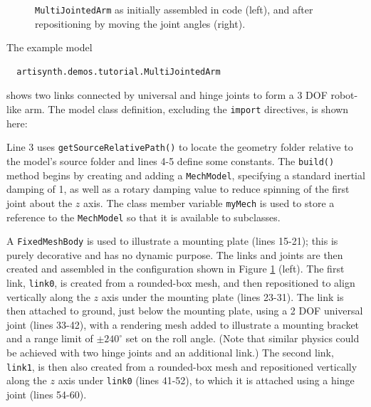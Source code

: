 \begin{figure}[ht]
\begin{center}
\begin{tabular}{cc}
\end{tabular}
\end{center}
\caption{{\tt MultiJointedArm} as initially assembled in code (left),
and after repositioning by moving the joint angles (right).}
\label{MultiJointedArm:fig}
\end{figure}

The example model
%
\begin{verbatim}
  artisynth.demos.tutorial.MultiJointedArm
\end{verbatim}
%
shows two links connected by universal and hinge joints to form a 3 DOF
robot-like arm. The model class definition, excluding the {\tt import} directives,
is shown here:
%
\lstset{numbers=left}
\iflatexml

\else

\fi
\lstset{numbers=none}
%
Line 3 uses {\tt getSourceRelativePath()} to locate the geometry folder
relative to the model's source folder and lines 4-5 define some constants.  The
{\tt build()} method begins by creating and adding a {\tt MechModel},
specifying a standard inertial damping of 1, as well as a rotary damping value
to reduce spinning of the first joint about the $z$ axis. The class member
variable {\tt myMech} is used to store a reference to the {\tt MechModel} so
that it is available to subclasses.

A {\tt FixedMeshBody} is used to illustrate a mounting plate (lines 15-21);
this is purely decorative and has no dynamic purpose. The links and joints are
then created and assembled in the configuration shown in
Figure \ref{MultiJointedArm:fig} (left). The first link, {\tt link0}, is
created from a rounded-box mesh, and then repositioned to align vertically
along the $z$ axis under the mounting plate (lines 23-31).  The link is then
attached to ground, just below the mounting plate, using a 2 DOF universal
joint (lines 33-42), with a rendering mesh added to illustrate a mounting
bracket and a range limit of $\pm 240^\circ$ set on the roll angle. (Note that
similar physics could be achieved with two hinge joints and an additional
link.) The second link, {\tt link1}, is then also created from a rounded-box
mesh and repositioned vertically along the $z$ axis under {\tt link0} (lines
41-52), to which it is attached using a hinge joint (lines 54-60).

